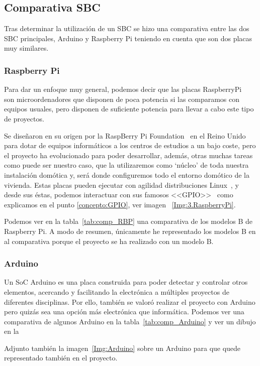 \subsection{Comparativa SBC}
Tras determinar la utilización de un SBC se hizo una comparativa entre las dos SBC principales, Arduino y Raspberry Pi teniendo en cuenta que son dos placas muy similares.

\subsubsection{Raspberry Pi}\label{4:RaspberryPi}
Para dar un enfoque muy general, podemos decir que las placas RaspberryPi~\cite{misc:RbPWeb} son microordenadores que disponen de poca potencia si las comparamos con equipos usuales, pero disponen de suficiente potencia para llevar a cabo este tipo de proyectos.

Se diseñaron en su origen por la RaspBerry Pi Foundation~\cite{misc:RbPWeb} en el Reino Unido para dotar de equipos informáticos a los centros de estudios a un bajo coste, pero el proyecto ha evolucionado para poder desarrollar, además, otras muchas tareas como puede ser nuestro caso, que la utilizaremos como ‘núcleo’ de toda nuestra instalación domótica y, será donde configuremos todo el entorno domótico de la vivienda.
Estas placas pueden ejecutar con agilidad distribuciones Linux~\cite{misc:Linux}, y desde sus éstas, podemos interactuar con sus famosos <<GPIO>>~\cite{misc:descubrearduino} como explicamos en el punto \ref{concepto:GPIO}, ver imagen ~\ref{Img:3.RaspberryPi}.

Podemos ver en la tabla~\ref{tab:comp_RBP} una comparativa de los modelos B de Raspberry Pi. A modo de resumen, únicamente he representado los modelos B en al comparativa porque el proyecto se ha realizado con un modelo B.

\subsubsection{Arduino}\label{4:Arduino}

Un SoC Arduino es una placa construida para poder detectar y controlar otros elementos, acercando y facilitando la electrónica a múltiples proyectos de diferentes disciplinas. Por ello, también se valoró realizar el proyecto con Arduino pero quizás sea una opción más electrónica que informática.
Podemos ver una comparativa de algunos Arduino en la tabla~\ref{tab:comp_Arduino} y ver un dibujo en la

Adjunto también la imagen~\ref{Img:Arduino} sobre un Arduino para que quede representado también en el proyecto.


